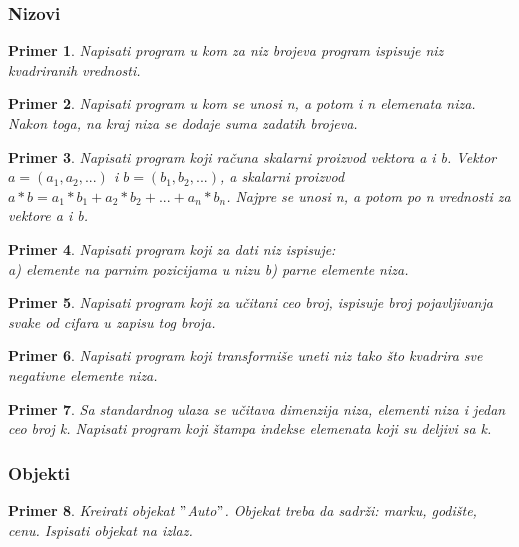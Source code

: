 \documentclass[a4paper]{article}
\newtheorem{primer}{Primer}[section]
\begin{document}
\subsubsection{Nizovi}

\begin{primer}
Napisati program u kom za niz brojeva program ispisuje niz kvadriranih vrednosti.
\end{primer}

\begin{primer}
Napisati program u kom se unosi n, a potom i n elemenata niza. Nakon toga, na kraj niza se dodaje suma zadatih brojeva.
\end{primer}

\begin{primer}
Napisati program koji računa skalarni proizvod vektora a i b. Vektor $a=(a_1, a_2,...)$ i $b=(b_1, b_2,...)$, a skalarni proizvod $a*b= a_1 * b_1 + a_2 * b_2 + ... + a_n * b_n$. Najpre se unosi n, a potom po n vrednosti za vektore a i b. 
\end{primer}

\begin{primer}
Napisati program koji za dati niz ispisuje:\\
a) elemente na parnim pozicijama u nizu
b) parne elemente niza.
\end{primer}

\begin{primer}
Napisati program koji za učitani ceo broj, ispisuje broj
pojavljivanja svake od cifara u zapisu tog broja.
\end{primer}


\begin{primer}
Napisati program koji transformiše uneti niz tako što
kvadrira sve negativne elemente niza. 
\end{primer}

\begin{primer}
Sa standardnog ulaza se učitava dimenzija niza, elementi
niza i jedan ceo broj k. Napisati program koji štampa indekse elemenata koji su
deljivi sa k.
\end{primer}

\subsubsection{Objekti}
\begin{primer}
Kreirati objekat $"$Auto$"$. Objekat treba da sadrži: marku, godište, cenu.
Ispisati objekat na izlaz.
\end{primer}
\end{document}
